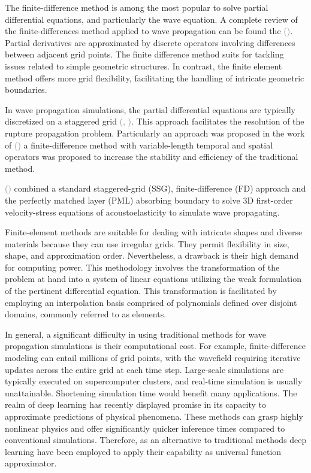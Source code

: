 \documentclass{tufte-handout}
\renewcommand{\citep}[2][]{\textcolor{gray}{(\citeauthor{#2}, \citeyear[#1]{#2})}}
\renewcommand{\citeauthoryear}[2][]{\textcolor{gray}{\citeauthor{#2} (\textcolor{gray}{\citeyear[#1]{#2}})}}
\begin{document}
The finite-difference method is among the most popular to solve partial differential equations, and particularly the wave equation. A complete review of the finite-differences method applied to wave propagation can be found the \citeauthoryear{Moczo2014}. Partial derivatives are approximated by discrete operators involving differences between adjacent grid points. The finite difference method suits for tackling issues related to simple geometric structures. In contrast, the finite element method offers more grid flexibility, facilitating the handling of intricate geometric boundaries.

In wave propagation simulations, the partial differential equations are typically discretized on a staggered grid \citep{Virieux1986}. This approach facilitates the resolution of the rupture propagation problem. Particularly an approach was proposed in the work of \citeauthoryear{Zhou2021} a finite-difference method with variable-length temporal and spatial operators was proposed to increase the stability and efficiency of the traditional method.

\citeauthoryear{liu_simulation_2023} combined a standard staggered-grid (SSG), finite-difference (FD) approach and the perfectly matched layer (PML) absorbing boundary to solve 3D first-order velocity-stress equations of acoustoelasticity to simulate wave propagating.

Finite-element methods are suitable for dealing with intricate shapes and diverse materials because they can use irregular grids. They permit flexibility in size, shape, and approximation order. Nevertheless, a drawback is their high demand for computing power. This methodology involves the transformation of the problem at hand into a system of linear equations utilizing the weak formulation of the pertinent differential equation. This transformation is facilitated by employing an interpolation basis comprised of polynomials defined over disjoint domains, commonly referred to as elements.

In general, a significant difficulty in using traditional methods for wave propagation simulations is their computational cost. For example, finite-difference modeling can entail millions of grid points, with the wavefield requiring iterative updates across the entire grid at each time step. Large-scale simulations are typically executed on supercomputer clusters, and real-time simulation is usually unattainable. Shortening simulation time would benefit many applications. The realm of deep learning has recently displayed promise in its capacity to approximate predictions of physical phenomena. These methods can grasp highly nonlinear physics and offer significantly quicker inference times compared to conventional simulations. Therefore, as an alternative to traditional methods deep learning have been employed to apply their capability as universal function approximator.
\end{document}
